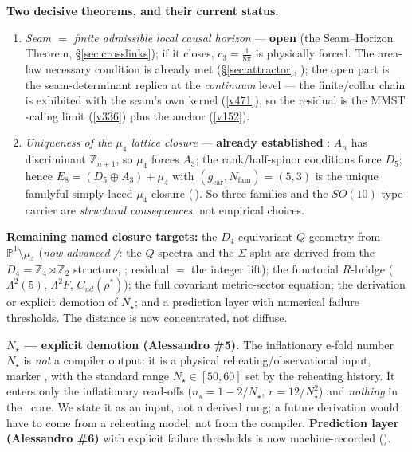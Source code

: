 \documentclass[11pt,a4paper]{article}
\newcommand{\cthree}{c_3}
\newcommand{\gcar}{g_{\mathrm{car}}}
\newcommand{\Nfam}{N_{\mathrm{fam}}}
\newcommand{\Z}{\mathbb Z}
\begin{document}
\noindent\textbf{Two decisive theorems, and their current status.}
\begin{enumerate}[leftmargin=1.7em,itemsep=2pt]
\item \emph{Seam $=$ finite admissible local causal horizon} --- \textbf{open \mO} (the Seam--Horizon
Theorem, \S\ref{sec:crosslinks}); if it closes, $\cthree=\tfrac1{8\pi}$ is physically forced. The area-law
necessary condition is already met (\S\ref{sec:attractor}, ); the open
part is the seam-determinant replica at the \emph{continuum} level --- the finite/collar chain is
exhibited with the seam's own kernel (\vref{v471}), so the residual is the MMST scaling limit
(\vref{v336}) plus the anchor (\vref{v152}).
\item \emph{Uniqueness of the $\mu_4$ lattice closure} --- \textbf{already established \mE}: $A_n$ has
discriminant $\Z_{n+1}$, so $\mu_4$ forces $A_3$; the rank/half-spinor conditions force $D_5$; hence
$E_8=(D_5{\oplus}A_3)+\mu_4$ with $(\gcar,\Nfam)=(5,3)$ is the unique familyful simply-laced $\mu_4$ closure
(\,). So three families and the
$SO(10)$-type carrier are \emph{structural consequences}, not empirical choices.
\end{enumerate}

\noindent\textbf{Remaining named closure targets:} the $D_4$-equivariant $Q$-geometry from
$\mathbb P^1\setminus\mu_4$ (\emph{now advanced \mC/\mE}: the $Q$-spectra and the $\Sigma$-split are
derived from the $D_4=\Z_4\rtimes\Z_2$ structure, ; residual $=$ the integer
lift); the functorial $R$-bridge ($\Lambda^2(5)$, $\Lambda^2F$, $C_{ud}(\rho^\ast)$);
the full covariant metric-sector equation; the derivation or explicit demotion of $N_\star$; and a
prediction layer with numerical failure thresholds. The distance is now concentrated, not diffuse.

\smallskip\noindent\textbf{$N_\star$ --- explicit demotion (Alessandro \#5).} The inflationary e-fold number
$N_\star$ is \emph{not} a compiler output: it is a physical reheating/observational input, marker \mC, with
the standard range $N_\star\in[50,60]$ set by the reheating history. It enters only the inflationary
read-offs ($n_s=1-2/N_\star$, $r=12/N_\star^2$) and \emph{nothing} in the \mE\ core. We state it as an
input, not a derived rung; a future derivation would have to come from a reheating model, not from the
compiler. \textbf{Prediction layer (Alessandro \#6)} with explicit failure thresholds is now machine-recorded
().
\end{document}
